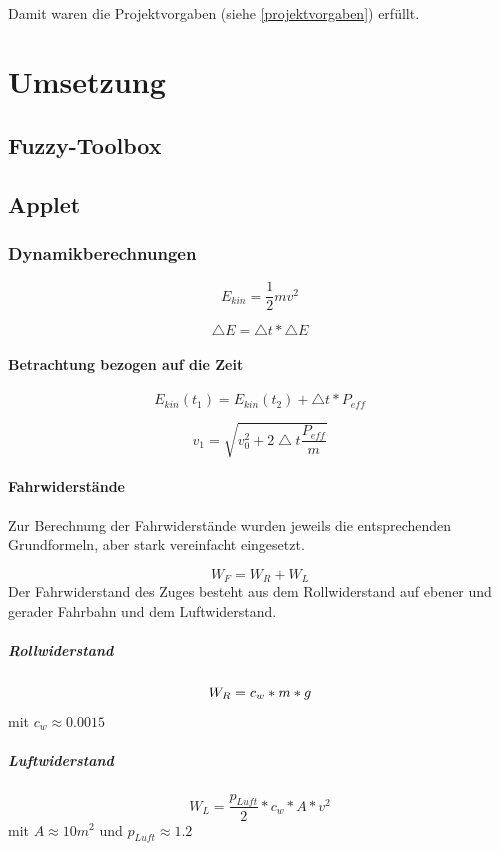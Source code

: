 \documentclass[10pt,a4paper]{article}
\begin{document}
\paragraph{}
Damit waren die Projektvorgaben (siehe \ref{projektvorgaben}) erfüllt.

\section{Umsetzung}

\subsection{Fuzzy-Toolbox}

\subsection{Applet}

\subsubsection{Dynamikberechnungen}
\begin{equation}
E_{kin} = \frac{1}{2} m v^{2} 
\end{equation}

\begin{equation}
\bigtriangleup E = \bigtriangleup t \ast \bigtriangleup E
\end{equation}

\paragraph{Betrachtung bezogen auf die Zeit}
\begin{equation}
E_{kin}(t_{1}) = E_{kin}(t_{2}) + \bigtriangleup t \ast P_{eff}
\end{equation}

\begin{equation}
v_{1} = \sqrt{v_{0}^2 + 2 \bigtriangleup t \frac{P_{eff}}{m}}
\end{equation}

\paragraph{Fahrwiderstände}

Zur Berechnung der Fahrwiderstände wurden jeweils die entsprechenden Grundformeln, aber stark vereinfacht eingesetzt.

\begin{equation}
W_F = W_R + W_L
\end{equation}
Der Fahrwiderstand des Zuges besteht aus dem Rollwiderstand auf ebener und gerader Fahrbahn und dem Luftwiderstand.
\subparagraph{Rollwiderstand}
\begin{equation}
W_R = c_w \ast m * g \\
\end{equation}
mit $ c_w \approx 0.0015 $
\subparagraph{Luftwiderstand}
\begin{equation}
W_L = \frac{p_{Luft}}{2} * c_w * A * v^2
\end{equation}
mit $ A \approx 10 m^2 $ und $ p_{Luft} \approx 1.2 $
\end{document}
